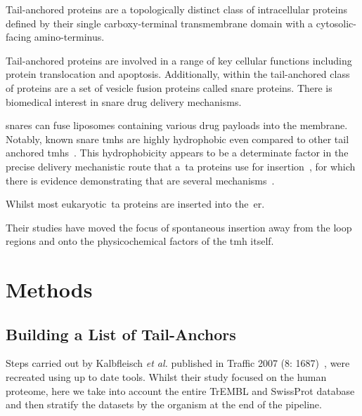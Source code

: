 Tail-anchored proteins are a topologically distinct class of intracellular proteins defined by their single carboxy-terminal transmembrane domain with a cytosolic-facing amino-terminus.

Tail-anchored proteins are involved in a range of key cellular functions including protein translocation and apoptosis.
Additionally, within the tail-anchored class of proteins are a set of vesicle fusion proteins called \gls{snare} proteins.
There is biomedical interest in \gls{snare} drug delivery mechanisms.

\gls{snare}s can fuse liposomes containing various drug payloads into the membrane.
Notably, known \gls{snare} \gls{tmh}s are highly hydrophobic even compared to other tail anchored \gls{tmh}s~\cite{Kalbfleisch2007}.
This hydrophobicity appears to be a determinate factor in the precise delivery mechanistic route that a~\gls{ta} proteins use for insertion~\cite{Rabu2008, Rabu2009}, for which there is evidence demonstrating that are several mechanisms~\cite{Rabu2009, Johnson2013}.

Whilst most eukaryotic~\gls{ta} proteins are inserted into the~\gls{er}.

Their studies have moved the focus of spontaneous insertion away from the loop regions and onto the physicochemical factors of the \gls{tmh} itself.

\section{Methods}

\subsection{Building a List of Tail-Anchors}
Steps carried out by Kalbfleisch \textit{et al.} published in Traffic 2007 (8: 1687)~\cite{Kalbfleisch2007}, were recreated using up to date tools.
Whilst their study focused on the human proteome, here we take into account the entire TrEMBL and SwissProt database and then stratify the datasets by the organism at the end of the pipeline.

